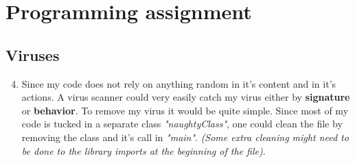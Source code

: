 \documentclass[12pt]{article}
\begin{document}
\section*{Programming assignment}
\subsection*{Viruses}
\begin{enumerate}[label=(\alph*)]
	\setcounter{enumi}{3}
 	\item Since my code does not rely on anything random in it's content and in it's actions. A virus scanner could very easily catch my virus either by \textbf{signature} or \textbf{behavior}. To remove my virus it would be quite simple. Since most of my code is tucked in a separate class \textit{"naughtyClass"}, one could clean the file by removing the class and it's call in \textit{"main"}. \textit{(Some extra cleaning might need to be done to the library imports at the beginning of the file)}.
\end{enumerate}
\end{document}
